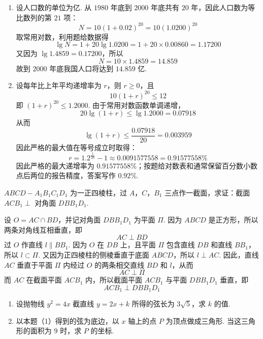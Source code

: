 \begin{solution}
\begin{enumerate}
\item 设人口数的单位为亿. 从 \(1980\) 年底到 \(2000\) 年底共有 \(20\) 年，因此人口数为等比数列的第 \(21\) 项：
\[
N=10(1+0.02)^{20}=10(1.0200)^{20}
\]
取常用对数，利用题给数据得
\[
\lg N=1+20\lg1.0200=1+20\times0.00860=1.17200
\]
又因为 \(\lg1.4859=0.17200\)，所以
\[
N=10\times1.4859=14.859
\]
故到 \(2000\) 年底我国人口将达到 \(14.859\text{ 亿}\).
\item 设每年比上年平均递增率为 \(r\)，则 \(r\ge0\)，且
\[
10(1+r)^{20}\le12
\]
即 \((1+r)^{20}\le1.2000\). 由于常用对数函数单调递增，
\[
20\lg(1+r)\le\lg1.2000=0.07918
\]
从而
\[
\lg(1+r)\le\frac{0.07918}{20}=0.003959
\]
因此严格的最大值在等号成立时取得：
\[
r=1.2^{\frac{1}{20}}-1\approx0.0091577558=0.91577558\%
\]
因此严格的最大递增率为 \(0.91577558\%\)；按题给对数表和通常保留百分数小数点后两位的报告精度，答案写作 \(0.92\%\).
\end{enumerate}
\end{solution}

\begin{problem}
\(ABCD-A_{1}B_{1}C_{1}D_{1}\) 为一正四棱柱，过 \(A\)，\(C\)，\(B_{1}\) 三点作一截面，求证：截面 \(ACB_{1}\perp\) 对角面 \(DBB_{1}D_{1}\).
\end{problem}

\begin{solution}
设 \(O=AC\cap BD\)，并记对角面 \(DBB_{1}D_{1}\) 为平面 \(\Pi\). 因为 \(ABCD\) 是正方形，所以两条对角线互相垂直，即
\[
AC\perp BD
\]
过 \(O\) 作直线 \(l\parallel BB_{1}\). 因为 \(O\) 在 \(DB\) 上，且平面 \(\Pi\) 包含直线 \(DB\) 和直线 \(BB_{1}\)，所以 \(l\subset\Pi\). 又因为正四棱柱的侧棱垂直于底面 \(ABCD\)，所以 \(l\perp AC\). 因此，直线 \(AC\) 垂直于平面 \(\Pi\) 内经过 \(O\) 的两条相交直线 \(BD\) 和 \(l\)，从而
\[
AC\perp\Pi
\]
而 \(AC\) 在截面平面 \(ACB_{1}\) 内，所以截面平面 \(ACB_{1}\) 与平面 \(DBB_{1}D_{1}\) 垂直，即
\[
ACB_{1}\perp DBB_{1}D_{1}
\]
\end{solution}

\begin{problem}
\begin{enumerate}
\item 设抛物线 \(y^{2}=4x\) 截直线 \(y=2x+k\) 所得的弦长为 \(3\sqrt{5}\)，求 \(k\) 的值.
\item 以本题（1）得到的弦为底边，以 \(x\) 轴上的点 \(P\) 为顶点做成三角形. 当这三角形的面积为 \(9\) 时，求 \(P\) 的坐标.
\end{enumerate}
\end{problem}

